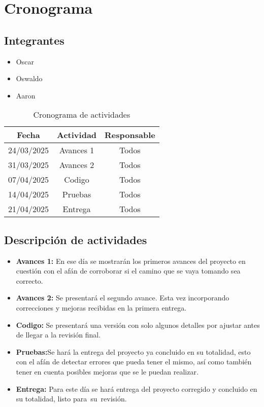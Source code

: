 \section*{Cronograma}

\subsection*{Integrantes}
\begin{itemize}
    \item Oscar
    \item Oswaldo
    \item Aaron
\end{itemize}

    \begin{table}[h]
        \begin{center}
            \begin{tabular}{| c | c  | c |}
                \hline
                Fecha & Actividad & Responsable 
                \\
                \hline
                24/03/2025 & Avances 1 & Todos
                \\
                \hline
                31/03/2025 & Avances 2 & Todos 
                \\
                \hline
                07/04/2025 & Codigo & Todos 
                \\
                \hline
                14/04/2025 & Pruebas & Todos 
                \\
                \hline
                21/04/2025 & Entrega & Todos 
                \\
                \hline
            \end{tabular}
        \caption{Cronograma de actividades}
        \end{center}
    \end{table}
\subsection*{Descripción de actividades}

\begin{itemize}
    \item \textbf{Avances 1:} En ese día se mostrarán los primeros avances del proyecto en cuestión con el afán de corroborar si el camino que se vaya tomando sea correcto.
    \item \textbf{Avances 2:} Se presentará el segundo avance. Esta vez incorporando correcciones y mejoras recibidas en la primera entrega.
    \item \textbf{Codigo:} Se presentará una versión con solo algunos detalles por ajustar antes de llegar a la revisión final.
    \item \textbf{Pruebas:}Se hará la entrega del proyecto ya concluido en su totalidad, esto con el afán de detectar errores que pueda tener el mismo, así como también tener en cuenta posibles mejoras que se le puedan realizar.
    \item \textbf{Entrega:} Para este día se hará entrega del proyecto corregido y concluido en su totalidad, listo para su revisión.
\end{itemize}
